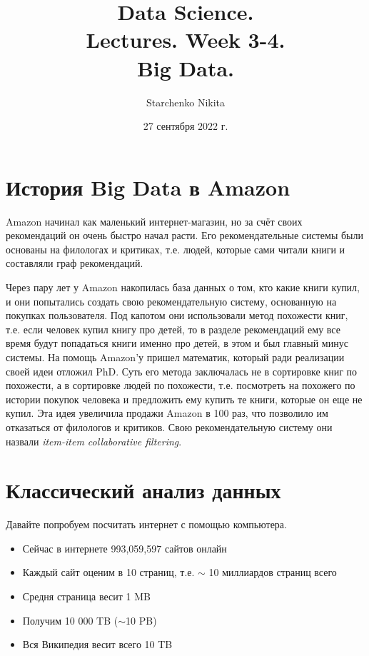 \documentclass{article}
\title{Data Science.\\Lectures. Week 3-4.\\ Big Data.}
\author{Starchenko Nikita}
\date{27 сентября 2022 г.}
\begin{document}
\maketitle

\tableofcontents

\newpage

\section{История Big Data в Amazon}

\indent\setlength{\parindent}{1em}Amazon начинал как маленький интернет-магазин, но за счёт своих рекомендаций он очень быстро начал расти. Его рекомендательные системы были основаны на филологах и критиках, т.е. людей, которые сами читали книги и составляли граф рекомендаций.

Через пару лет у Amazon накопилась база данных о том, кто какие книги купил, и они попытались создать свою рекомендательную систему, основанную на покупках пользователя. Под капотом они использовали метод похожести книг, т.е. если человек купил книгу про детей, то в разделе рекомендаций ему все время будут попадаться книги именно про детей, в этом и был главный минус системы. На помощь Amazon'у пришел математик, который ради реализации своей идеи отложил PhD. Суть его метода заключалась не в сортировке книг по похожести, а в сортировке людей по похожести, т.е. посмотреть на похожего по истории покупок человека и предложить ему купить те книги, которые он еще не купил. Эта идея увеличила продажи Amazon в 100 раз, что позволило им отказаться от филологов и критиков. Свою рекомендательную систему они назвали \textit{item-item collaborative filtering}.



\section{Классический анализ данных}

Давайте попробуем посчитать интернет с помощью компьютера.

\begin{itemize}
    \item Сейчас в интернете 993,059,597 сайтов онлайн
    \item Каждый сайт оценим в 10 страниц, т.е. $\sim $ 10 миллиардов страниц всего
    \item Средня страница весит 1 MB
    \item Получим 10 000 TB ($\sim $10 PB)
    \item Вся Википедия весит всего 10 TB
\end{itemize}
\end{document}
